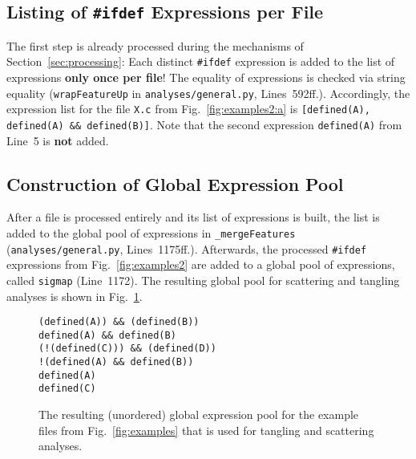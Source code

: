 \documentclass[a4paper]{scrartcl}
\newcommand\sub[1]{\textsubscript{#1}}
\newcommand\code[1]{\texttt{#1}}
\newcommand\feature[1]{\texttt{#1}}
\newcommand\metric[1]{{#1}}
\newcommand\ifdeff[1]{\code{\##1}\xspace}
\newcommand\ifdef[0]{{\upshape\ifdeff{ifdef}}\xspace}
\begin{document}
\subsection{Listing of \ifdef Expressions per File}

The first step is already processed during the mechanisms of Section~\ref{sec:processing}:
Each distinct \ifdef expression is added to the list of expressions \textbf{only once per file}!
The equality of expressions is checked via string equality (\code{wrapFeatureUp} in \code{analyses/general.py}, Lines~592ff.).
Accordingly, the expression list for the file \code{X.c} from Fig.\ \ref{fig:examples2:a} is \feature{[defined(A), defined(A) \&\& defined(B)]}.
Note that the second expression \feature{defined(A)} from Line~5 is \textbf{not} added.


\subsection{Construction of Global Expression Pool}

After a file is processed entirely and its list of expressions is built, the list is added to the global pool of expressions in \code{\_mergeFeatures} (\code{analyses/general.py}, Lines~1175ff.).
Afterwards, the processed \ifdef expressions from Fig.\ \ref{fig:examples2} are added to a global pool of expressions, called \code{sigmap} (Line~1172).
The resulting global pool for scattering and tangling analyses is shown in Fig.\ \ref{fig:pool}.

\begin{figure}[htp]
\begin{lstlisting}
(defined(A)) && (defined(B))
defined(A) && defined(B)
(!(defined(C))) && (defined(D))
!(defined(A) && defined(B))
defined(A)
defined(C)
\end{lstlisting}
\caption{The resulting (unordered) global expression pool for the example files from Fig.\ \ref*{fig:examples} that is used for tangling and scattering analyses.}
\label{fig:pool}
\end{figure}


%
%



\end{document}

